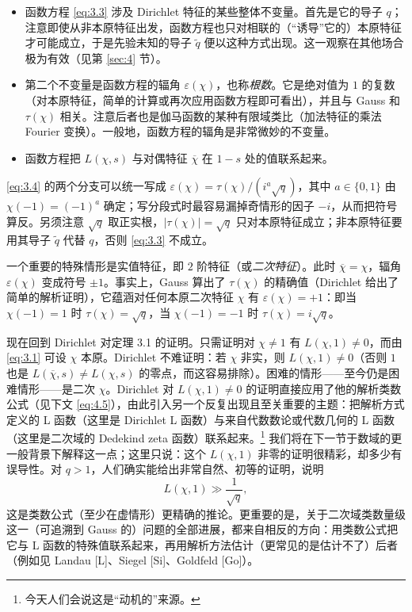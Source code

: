 \begin{itemize}[leftmargin=1.6em]
\item 函数方程 \eqref{eq:3.3} 涉及 Dirichlet 特征的某些整体不变量。首先是它的导子 $q$；注意即使从非本原特征出发，函数方程也只对相联的（“诱导”它的）本原特征才可能成立，于是先验未知的导子 $\tilde q$ 便以这种方式出现。这一观察在其他场合极为有效（见第 \ref{sec:4} 节）。
\item 第二个不变量是函数方程的辐角 $\varepsilon(\chi)$，也称\emph{根数}。它是绝对值为 $1$ 的复数（对本原特征，简单的计算或再次应用函数方程即可看出），并且与 Gauss 和 $\tau(\chi)$ 相关。注意后者也是伽马函数的某种有限域类比（加法特征的乘法 Fourier 变换）。一般地，函数方程的辐角是非常微妙的不变量。
\item 函数方程把 $L(\chi,s)$ 与对偶特征 $\overline{\chi}$ 在 $1-s$ 处的值联系起来。
\end{itemize}

\begin{annote}
\eqref{eq:3.4} 的两个分支可以统一写成 $\varepsilon(\chi)=\tau(\chi)/(i^{a}\sqrt{q})$，其中 $a\in\{0,1\}$ 由 $\chi(-1)=(-1)^{a}$ 确定；写分段式时最容易漏掉奇情形的因子 $-i$，从而把符号算反。另须注意 $\sqrt{q}$ 取正实根，$|\tau(\chi)|=\sqrt{q}$ 只对本原特征成立；非本原特征要用其导子 $\tilde q$ 代替 $q$，否则 \eqref{eq:3.3} 不成立。
\par\vspace{0.15em}{\raggedleft 【来源：Serre《A Course in Arithmetic》Ch.~VI \S2（A）；Iwaniec--Kowalski 前引书 Gauss 和一节（A）】\par}
\end{annote}

一个重要的特殊情形是实值特征，即 $2$ 阶特征（或\emph{二次特征}）。此时 $\overline{\chi}=\chi$，辐角 $\varepsilon(\chi)$ 变成符号 $\pm1$。事实上，Gauss 算出了 $\tau(\chi)$ 的精确值（Dirichlet 给出了简单的解析证明），它蕴涵对任何本原二次特征 $\chi$ 有 $\varepsilon(\chi)=+1$：即当 $\chi(-1)=1$ 时 $\tau(\chi)=\sqrt{q}$，当 $\chi(-1)=-1$ 时 $\tau(\chi)=i\sqrt{q}$。

现在回到 Dirichlet 对定理 3.1 的证明。只需证明对 $\chi\neq 1$ 有 $L(\chi,1)\neq 0$，而由 \eqref{eq:3.1} 可设 $\chi$ 本原。Dirichlet 不难证明：若 $\chi$ 非实，则 $L(\chi,1)\neq 0$（否则 $1$ 也是 $L(\overline{\chi},s)\neq L(\chi,s)$ 的零点，而这容易排除）。困难的情形——至今仍是困难情形——是二次 $\chi$。Dirichlet 对 $L(\chi,1)\neq 0$ 的证明直接应用了他的解析类数公式（见下文 \eqref{eq:4.5}），由此引入另一个反复出现且至关重要的主题：把解析方式定义的 L 函数（这里是 Dirichlet L 函数）与来自代数数论或代数几何的 L 函数（这里是二次域的 Dedekind zeta 函数）联系起来。\footnote{今天人们会说这是“动机的”来源。} 我们将在下一节于数域的更一般背景下解释这一点；这里只说：这个 $L(\chi,1)$ 非零的证明很精彩，却多少有误导性。对 $q>1$，人们确实能给出非常自然、初等的证明，说明
\[
L(\chi,1)\gg\frac{1}{\sqrt{q}},
\]
这是类数公式（至少在虚情形）更精确的推论。更重要的是，关于二次域类数量级这一（可追溯到 Gauss 的）问题的全部进展，都来自相反的方向：用类数公式把它与 L 函数的特殊值联系起来，再用解析方法估计（更常见的是估计不了）后者（例如见 Landau [L]、Siegel [Si]、Goldfeld [Go]）。

